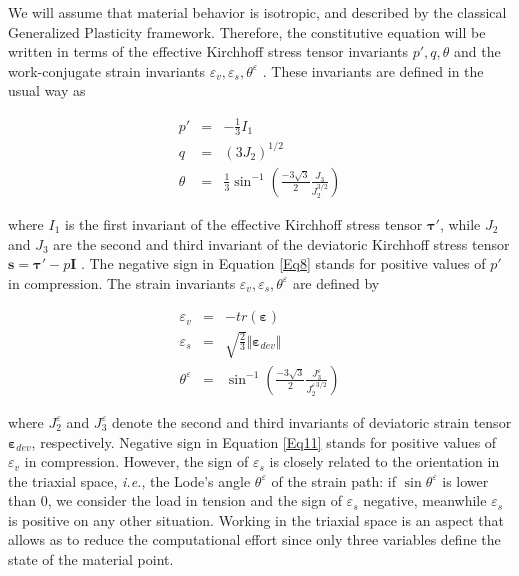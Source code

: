 \documentclass[preprint,12pt,a4paper]{elsarticle}
\begin{document}
We will assume that material behavior is isotropic, and described by the classical Generalized Plasticity framework. Therefore, the constitutive equation will be written in terms of the effective Kirchhoff stress tensor invariants  $p', q, \theta $ and the work-conjugate strain invariants $\varepsilon_v, \varepsilon_s, \theta^{\varepsilon}$ . These invariants are defined in the usual way as

\begin{eqnarray}
p' &=&-\frac{1}{3}I_1 \label{Eq8}\\ 
q &=&(3J_2)^{1/2}\label{Eq9} \\
\theta &=& \frac{1}{3} \sin^{-1}\left(\frac{-3\sqrt{3}}{2}\frac{J_3}{J_2^{3/2}}\right)\label{Eq10} 
\end{eqnarray}

where $I_1$ is the first invariant of the effective Kirchhoff stress tensor $\boldsymbol{\tau}'$,  while $J_2$ and $J_3$ are the second and third invariant of the deviatoric Kirchhoff stress tensor $\boldsymbol{s}=\boldsymbol{\tau}'-p\boldsymbol{I}$ . The negative sign in Equation \eqref{Eq8} stands for positive values of $p'$ in compression. The strain invariants $\varepsilon_v, \varepsilon_s, \theta^{\varepsilon}$ are defined by


\begin{eqnarray}
\varepsilon_v &=&- tr(\boldsymbol{\varepsilon})\label{Eq11}\\ 
\varepsilon_s &=&\sqrt{\frac{2}{3}}\Vert \boldsymbol{\varepsilon}_{dev} \Vert \label{Eq12}\\ 
\theta^{\varepsilon} &=& \sin^{-1}\left(\frac{-3\sqrt{3}}{2}\frac{J^{\varepsilon}_3}{J_2^{\varepsilon \, 3/2}}\right)\label{Eq13} 
\end{eqnarray}

where $J^{\varepsilon}_2$ and $J^{\varepsilon}_3$ denote the second
and third invariants of deviatoric strain tensor $\boldsymbol{\varepsilon}_{dev}$, respectively. Negative sign in Equation \eqref{Eq11} stands for positive values of $\varepsilon_v$ in compression. However, the sign of $\varepsilon_s$ is closely related to the orientation in the triaxial space, \textit{i.e.}, the Lode's angle $\theta^{\varepsilon}$ of the strain path: if $\sin \theta^{\varepsilon}$ is lower than 0, we consider the load in tension and the sign of $\varepsilon_s$ negative, meanwhile $\varepsilon_s$ is positive on any other situation. Working in the triaxial space is an aspect that allows as to reduce the computational effort since only three variables define the state of the material point.
\end{document}
